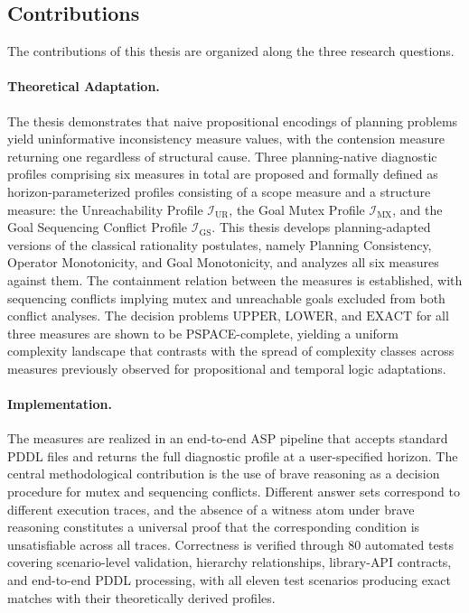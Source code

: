 \subsection{Contributions}
\label{sec:contributions}

The contributions of this thesis are organized along the three research questions.

\paragraph{Theoretical Adaptation.}
The thesis demonstrates that naive propositional encodings of planning problems yield uninformative inconsistency measure values, with the contension measure returning one regardless of structural cause. Three plan\-ning-native diagnostic profiles comprising six measures in total are proposed and formally defined as horizon-parameterized profiles consisting of a scope measure and a structure measure: the Unreachability Profile $\mathcal{I}_{\text{UR}}$, the Goal Mutex Profile $\mathcal{I}_{\text{MX}}$, and the Goal Sequencing Conflict Profile $\mathcal{I}_{\text{GS}}$. This thesis develops planning-adapted versions of the classical rationality postulates, namely Planning Consistency, Operator Monotonicity, and Goal Monotonicity, and analyzes all six measures against them. The containment relation between the measures is established, with sequencing conflicts implying mutex and unreachable goals excluded from both conflict analyses. The decision problems $\text{UPPER}$, $\text{LOWER}$, and $\text{EXACT}$ for all three measures are shown to be PSPACE-complete, yielding a uniform complexity landscape that contrasts with the spread of complexity classes across measures previously observed for propositional and temporal logic adaptations.

\paragraph{Implementation.}
The measures are realized in an end-to-end \ac{ASP} pipeline that accepts standard \ac{PDDL} files and returns the full diagnostic profile at a user-specified horizon. The central methodological contribution is the use of brave reasoning as a decision procedure for mutex and sequencing conflicts. Different answer sets correspond to different execution traces, and the absence of a witness atom under brave reasoning constitutes a universal proof that the corresponding condition is unsatisfiable across all traces. Correctness is verified through 80 automated tests covering scenario-level validation, hierarchy relationships, library-\ac{API} contracts, and end-to-end \ac{PDDL} processing, with all eleven test scenarios producing exact matches with their theoretically derived profiles.

